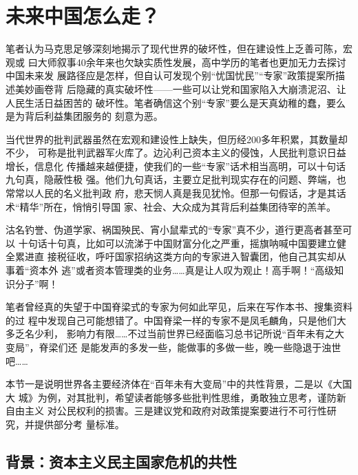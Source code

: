 \chapter{未来中国怎么走？}


笔者认为马克思足够深刻地揭示了现代世界的破坏性，但在建设性上乏善可陈，宏观或
曰大师叙事40余年来也欠缺实质性发展，高中学历的笔者也更加无力去探讨中国未来发
展路径应是怎样，但自认可发现个别“忧国忧民”“专家”政策提案所描述美妙画卷背
后隐藏的真实破坏性——一些可以让党和国家陷入大崩溃泥沼、让人民生活日益困苦的
破坏性。笔者确信这个别“专家”要么是天真幼稚的蠢，要么是为背后利益集团服务的
刻意为恶。

当代世界的批判武器虽然在宏观和建设性上缺失，但历经200多年积累，其数量却不少，
可称是批判武器军火库了。边沁利己资本主义的侵蚀，人民批判意识日益增长，信息化
传播越来越便捷，使我们的一些“专家”话术相当高明，可以十句话九句真，隐蔽性极
强。他们九句真话，主要立足批判现实存在的问题、弊端，也常常以人民的名义批判政
府，悲天悯人真是我见犹怜。但那一句假话，才是其话术“精华”所在，悄悄引导国
家、社会、大众成为其背后利益集团待宰的羔羊。

沽名钓誉、伪道学家、祸国殃民、宵小鼠辈式的“专家”真不少，道行更高者甚至可以
十句话十句真，比如可以流涕于中国财富分化之严重，摇旗呐喊中国要建立健全累进直
接税征收，呼吁国家招纳这类方向的专家进入智囊团，他自己其实却从事着“资本外
逃”或者资本管理类的业务……真是让人叹为观止！高手啊！“高级知识分子”啊！

笔者曾经真的失望于中国脊梁式的专家为何如此罕见，后来在写作本书、搜集资料的过
程中发现自己可能想错了。中国脊梁一样的专家不是凤毛麟角，只是他们大多乏名少利，
影响力有限……不过当前世界已经面临习总书记所说“百年未有之大变局”，脊梁们还
是能发声的多发一些，能做事的多做一些，晚一些隐退于浊世吧……

本节一是说明世界各主要经济体在“百年未有大变局”中的共性背景，二是以《大国大
城》为例，对其批判，希望读者能够多些批判性思维，勇敢独立思考，谨防新自由主义
对公民权利的损害。三是建议党和政府对政策提案要进行不可行性研究，并提供部分考
量标准。


\section{背景：资本主义民主国家危机的共性}


